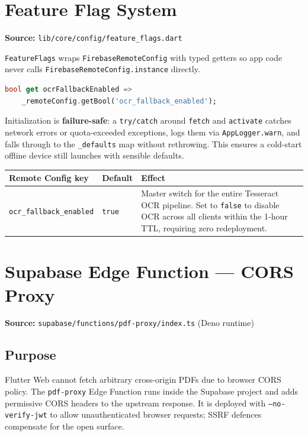 \documentclass[11pt,a4paper]{article}
\begin{document}
\section{Feature Flag System}

\textbf{Source:} \texttt{lib/core/config/feature\_flags.dart}

\texttt{FeatureFlags} wraps \texttt{FirebaseRemoteConfig} with typed getters so app code
never calls \texttt{FirebaseRemoteConfig.instance} directly.

\begin{lstlisting}[language=Dart]
bool get ocrFallbackEnabled =>
    _remoteConfig.getBool('ocr_fallback_enabled');
\end{lstlisting}

Initialization is \textbf{failure-safe}: a \texttt{try/catch} around \texttt{fetch} and
\texttt{activate} catches network errors or quota-exceeded exceptions, logs them via
\texttt{AppLogger.warn}, and falls through to the \texttt{\_defaults} map without
rethrowing. This ensures a cold-start offline device still launches with sensible
defaults.

\vspace{4pt}
\begin{tabularx}{\textwidth}{@{}L{4.4cm} C{1.8cm} L{7.4cm}@{}}
  \toprule
  \textbf{Remote Config key} & \textbf{Default} & \textbf{Effect} \\
  \midrule
  \texttt{ocr\_fallback\_enabled} & \texttt{true} &
    Master switch for the entire Tesseract OCR pipeline. Set to \texttt{false} to
    disable OCR across all clients within the 1-hour TTL, requiring zero redeployment. \\
  \bottomrule
\end{tabularx}

\section{Supabase Edge Function --- CORS Proxy}

\textbf{Source:} \texttt{supabase/functions/pdf-proxy/index.ts} (Deno runtime)

\subsection{Purpose}

Flutter Web cannot fetch arbitrary cross-origin PDFs due to browser CORS policy. The
\texttt{pdf-proxy} Edge Function runs inside the Supabase project and adds permissive
CORS headers to the upstream response. It is deployed with
\texttt{--no-verify-jwt} to allow unauthenticated browser requests; SSRF defences
compensate for the open surface.
\end{document}
